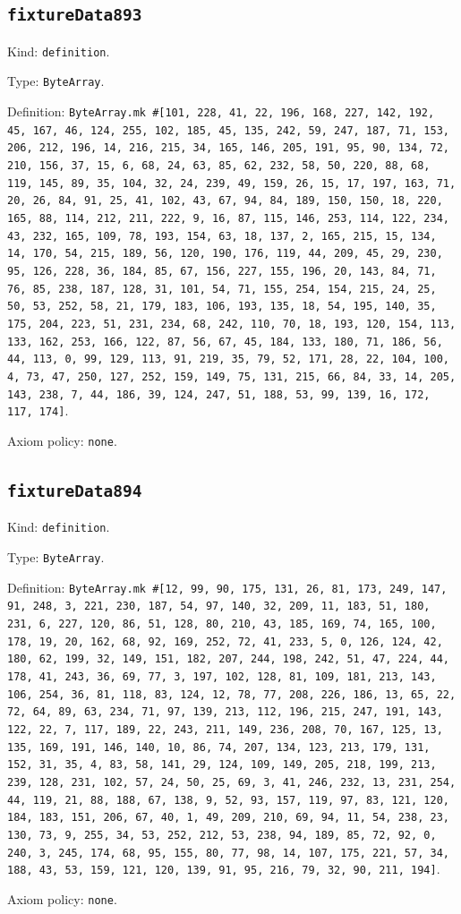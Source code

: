\documentclass[11pt]{article}
\begin{document}
\subsection*{\texttt{fixtureData893}}
\noindent Kind: \texttt{definition}.\par
\noindent Type: \texttt{ByteArray}.\par
\noindent Definition: \texttt{ByteArray.mk \#[101, 228, 41, 22, 196, 168, 227, 142, 192, 45, 167, 46, 124, 255, 102, 185, 45, 135, 242, 59, 247, 187, 71, 153, 206, 212, 196, 14, 216, 215, 34, 165, 146, 205, 191, 95, 90, 134, 72, 210, 156, 37, 15, 6, 68, 24, 63, 85, 62, 232, 58, 50, 220, 88, 68, 119, 145, 89, 35, 104, 32, 24, 239, 49, 159, 26, 15, 17, 197, 163, 71, 20, 26, 84, 91, 25, 41, 102, 43, 67, 94, 84, 189, 150, 150, 18, 220, 165, 88, 114, 212, 211, 222, 9, 16, 87, 115, 146, 253, 114, 122, 234, 43, 232, 165, 109, 78, 193, 154, 63, 18, 137, 2, 165, 215, 15, 134, 14, 170, 54, 215, 189, 56, 120, 190, 176, 119, 44, 209, 45, 29, 230, 95, 126, 228, 36, 184, 85, 67, 156, 227, 155, 196, 20, 143, 84, 71, 76, 85, 238, 187, 128, 31, 101, 54, 71, 155, 254, 154, 215, 24, 25, 50, 53, 252, 58, 21, 179, 183, 106, 193, 135, 18, 54, 195, 140, 35, 175, 204, 223, 51, 231, 234, 68, 242, 110, 70, 18, 193, 120, 154, 113, 133, 162, 253, 166, 122, 87, 56, 67, 45, 184, 133, 180, 71, 186, 56, 44, 113, 0, 99, 129, 113, 91, 219, 35, 79, 52, 171, 28, 22, 104, 100, 4, 73, 47, 250, 127, 252, 159, 149, 75, 131, 215, 66, 84, 33, 14, 205, 143, 238, 7, 44, 186, 39, 124, 247, 51, 188, 53, 99, 139, 16, 172, 117, 174]}.\par
\noindent Axiom policy: \texttt{none}.\par
\subsection*{\texttt{fixtureData894}}
\noindent Kind: \texttt{definition}.\par
\noindent Type: \texttt{ByteArray}.\par
\noindent Definition: \texttt{ByteArray.mk \#[12, 99, 90, 175, 131, 26, 81, 173, 249, 147, 91, 248, 3, 221, 230, 187, 54, 97, 140, 32, 209, 11, 183, 51, 180, 231, 6, 227, 120, 86, 51, 128, 80, 210, 43, 185, 169, 74, 165, 100, 178, 19, 20, 162, 68, 92, 169, 252, 72, 41, 233, 5, 0, 126, 124, 42, 180, 62, 199, 32, 149, 151, 182, 207, 244, 198, 242, 51, 47, 224, 44, 178, 41, 243, 36, 69, 77, 3, 197, 102, 128, 81, 109, 181, 213, 143, 106, 254, 36, 81, 118, 83, 124, 12, 78, 77, 208, 226, 186, 13, 65, 22, 72, 64, 89, 63, 234, 71, 97, 139, 213, 112, 196, 215, 247, 191, 143, 122, 22, 7, 117, 189, 22, 243, 211, 149, 236, 208, 70, 167, 125, 13, 135, 169, 191, 146, 140, 10, 86, 74, 207, 134, 123, 213, 179, 131, 152, 31, 35, 4, 83, 58, 141, 29, 124, 109, 149, 205, 218, 199, 213, 239, 128, 231, 102, 57, 24, 50, 25, 69, 3, 41, 246, 232, 13, 231, 254, 44, 119, 21, 88, 188, 67, 138, 9, 52, 93, 157, 119, 97, 83, 121, 120, 184, 183, 151, 206, 67, 40, 1, 49, 209, 210, 69, 94, 11, 54, 238, 23, 130, 73, 9, 255, 34, 53, 252, 212, 53, 238, 94, 189, 85, 72, 92, 0, 240, 3, 245, 174, 68, 95, 155, 80, 77, 98, 14, 107, 175, 221, 57, 34, 188, 43, 53, 159, 121, 120, 139, 91, 95, 216, 79, 32, 90, 211, 194]}.\par
\noindent Axiom policy: \texttt{none}.\par
\end{document}
